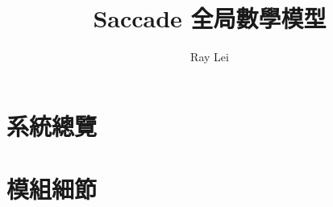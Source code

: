 \documentclass[11pt,oneside]{ctexbook}   %
\title{Saccade 全局數學模型}
\author{Ray Lei}
\begin{document}
\maketitle
\setcounter{page}{2}
\tableofcontents

\part{系統總覽}


\part{模組細節}

\appendix

\end{document}
